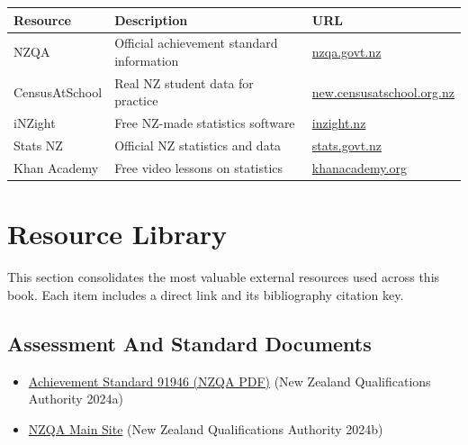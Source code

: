 \documentclass[
  11pt,
  a4paper,
  oneside,
  open=any]{scrbook}
\providecommand{\tightlist}{%
  \setlength{\itemsep}{0pt}\setlength{\parskip}{0pt}}
\begin{document}
\begin{longtable}[]{@{}
  >{\raggedright\arraybackslash}p{}
  >{\raggedright\arraybackslash}p{}
  >{\raggedright\arraybackslash}p{}@{}}
\toprule\noalign{}
\begin{minipage}[b]{\linewidth}\raggedright
Resource
\end{minipage} & \begin{minipage}[b]{\linewidth}\raggedright
Description
\end{minipage} & \begin{minipage}[b]{\linewidth}\raggedright
URL
\end{minipage} \\
\midrule\noalign{}
\endhead
\bottomrule\noalign{}
\endlastfoot
NZQA & Official achievement standard information &
\href{https://www.nzqa.govt.nz}{nzqa.govt.nz} \\
CensusAtSchool & Real NZ student data for practice &
\href{https://new.censusatschool.org.nz}{new.censusatschool.org.nz} \\
iNZight & Free NZ-made statistics software &
\href{https://inzight.nz}{inzight.nz} \\
Stats NZ & Official NZ statistics and data &
\href{https://www.stats.govt.nz}{stats.govt.nz} \\
Khan Academy & Free video lessons on statistics &
\href{https://www.khanacademy.org}{khanacademy.org} \\
\end{longtable}


\chapter{Resource Library}\label{resource-library}

This section consolidates the most valuable external resources used
across this book. Each item includes a direct link and its bibliography
citation key.

\section{Assessment And Standard
Documents}\label{assessment-and-standard-documents}

\begin{itemize}
\tightlist
\item
  \href{https://www.nzqa.govt.nz/nqfdocs/ncea-resource/achievements/2024/as91946.pdf}{Achievement
  Standard 91946 (NZQA PDF)} (New Zealand Qualifications Authority
  2024a)
\item
  \href{https://www.nzqa.govt.nz}{NZQA Main Site} (New Zealand
  Qualifications Authority 2024b)
\end{itemize}
\end{document}
